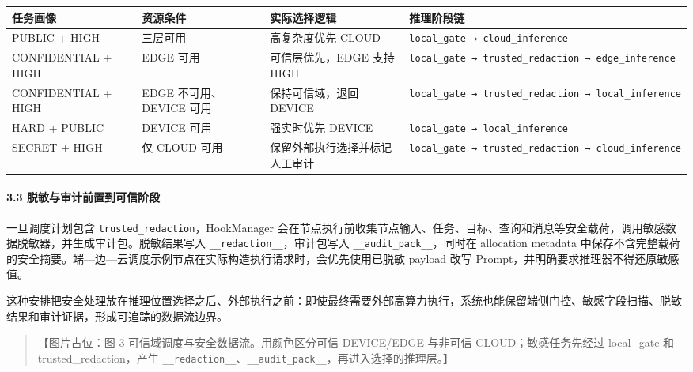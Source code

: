 \documentclass[UTF8,a4paper,12pt]{ctexart}
\begin{document}
\begin{longtable}[]{@{}
  >{\raggedright\arraybackslash}p{}
  >{\raggedright\arraybackslash}p{}
  >{\raggedright\arraybackslash}p{}
  >{\raggedright\arraybackslash}p{}@{}}
\toprule
任务画像 & 资源条件 & 实际选择逻辑 & 推理阶段链 \\
\midrule
\endhead
PUBLIC + HIGH & 三层可用 & 高复杂度优先 CLOUD & \texttt{local\_gate\ →\ cloud\_inference} \\
CONFIDENTIAL + HIGH & EDGE 可用 & 可信层优先，EDGE 支持 HIGH & \texttt{local\_gate\ →\ trusted\_redaction\ →\ edge\_inference} \\
CONFIDENTIAL + HIGH & EDGE 不可用、DEVICE 可用 & 保持可信域，退回 DEVICE & \texttt{local\_gate\ →\ trusted\_redaction\ →\ local\_inference} \\
HARD + PUBLIC & DEVICE 可用 & 强实时优先 DEVICE & \texttt{local\_gate\ →\ local\_inference} \\
SECRET + HIGH & 仅 CLOUD 可用 & 保留外部执行选择并标记人工审计 & \texttt{local\_gate\ →\ trusted\_redaction\ →\ cloud\_inference} \\
\bottomrule
\end{longtable}

\paragraph{3.3 脱敏与审计前置到可信阶段}

一旦调度计划包含 \texttt{trusted\_redaction}，HookManager 会在节点执行前收集节点输入、任务、目标、查询和消息等安全载荷，调用敏感数据脱敏器，并生成审计包。脱敏结果写入 \texttt{\_\_redaction\_\_}，审计包写入 \texttt{\_\_audit\_pack\_\_}，同时在 allocation metadata 中保存不含完整载荷的安全摘要。端—边—云调度示例节点在实际构造执行请求时，会优先使用已脱敏 payload 改写 Prompt，并明确要求推理器不得还原敏感值。

这种安排把安全处理放在推理位置选择之后、外部执行之前：即使最终需要外部高算力执行，系统也能保留端侧门控、敏感字段扫描、脱敏结果和审计证据，形成可追踪的数据流边界。

\begin{quote}
【图片占位：图 3 可信域调度与安全数据流。用颜色区分可信 DEVICE/EDGE 与非可信 CLOUD；敏感任务先经过 local\_gate 和 trusted\_redaction，产生 \texttt{\_\_redaction\_\_}、\texttt{\_\_audit\_pack\_\_}，再进入选择的推理层。】
\end{quote}
\end{document}
